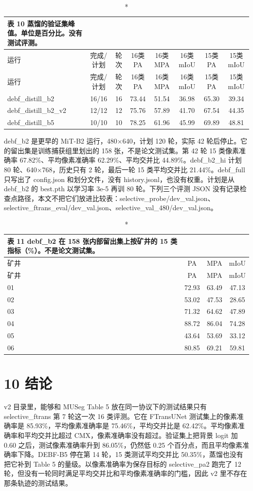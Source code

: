 \documentclass[11pt]{article}
\begin{document}
{\footnotesize\setlength{\tabcolsep}{3pt}
\begin{longtable}{lccccccc}
\caption*{表 10  蒸馏的验证集峰值。单位是百分比。没有测试评测。}\\
\toprule
运行 & 完成/计划 & 轮次 & 16类 PA & 16类 MPA & 16类 mIoU & 15类 PA & 15类 mIoU\\
\midrule
\endfirsthead
\toprule
运行 & 完成/计划 & 轮次 & 16类 PA & 16类 MPA & 16类 mIoU & 15类 PA & 15类 mIoU\\
\midrule
\endhead
debf\_distill\_b2 & 16/16 & 16 & 73.44 & 51.54 & 36.98 & 65.30 & 39.34\\
debf\_distill\_b2\_v2 & 12/12 & 12 & 75.76 & 57.89 & 41.70 & 67.54 & 44.35\\
debf\_distill\_b5 & 10/10 & 10 & 78.25 & 61.96 & 45.99 & 69.89 & 48.81\\
\bottomrule
\end{longtable}
}
debf\_b2 是更早的 MiT-B2 运行，480×640，计划 120 轮，实际 42 轮后停止。它的留出集是训练捕获组里划出的 158 张，不是论文测试集。第 42 轮 15 类像素准确率 67.82\%、平均像素准确率 62.29\%、平均交并比 44.89\%。debf\_b2\_hi 计划 80 轮、640×768，历史只有 2 轮，最后一轮 15 类平均交并比 21.44\%。debf\_full 只写出了 config.json 和划分文件，没有 history.jsonl，也没有权重。计划是从 debf\_b2 的 best.pth 以学习率 3e-5 再训 80 轮。下列三个评测 JSON 没有记录检查点路径，本文不把它们放进比较表：selective\_probe/dev\_val.json、selective\_ftrans\_eval/dev\_val.json、selective\_val\_480/dev\_val.json。

{\footnotesize\setlength{\tabcolsep}{3pt}
\begin{longtable}{lccc}
\caption*{表 11  debf\_b2 在 158 张内部留出集上按矿井的 15 类指标（\%）。不是论文测试集。}\\
\toprule
矿井 & PA & MPA & mIoU\\
\midrule
\endfirsthead
\toprule
矿井 & PA & MPA & mIoU\\
\midrule
\endhead
01 & 72.93 & 63.49 & 47.13\\
02 & 53.02 & 47.53 & 28.65\\
03 & 71.32 & 64.62 & 47.89\\
04 & 88.72 & 86.04 & 74.28\\
05 & 43.64 & 53.69 & 33.12\\
06 & 80.85 & 69.21 & 59.81\\
\bottomrule
\end{longtable}
}
\section*{10  结论}
v2 目录里，能够和 MUSeg Table 5 放在同一协议下的测试结果只有 selective\_ftrans 第 7 轮这一次 16 类评测。它在 FTransUNet 测试集上的像素准确率是 85.93\%，平均像素准确率是 75.46\%，平均交并比是 62.42\%。平均像素准确率和平均交并比超过 CMX，像素准确率没有超过。验证集上把背景 logit 加 0.60 之后，测试像素准确率升到 86.05\%，仍然低 0.25 个百分点，而且平均像素准确率下降。DEBF-B5 停在第 14 轮，15 类测试平均交并比 50.35\%，蒸馏也没有把它补到 Table 5 的量级。以像素准确率为保存目标的 selective\_pa2 跑完了 12 轮，但没有一轮同时满足平均交并比和平均像素准确率的门槛，因此 v2 里不存在那条轨迹的测试结果。
\end{document}
